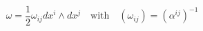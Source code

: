 \begin{equation}
    \label{eq:SymplecticForm}
    \omega = \frac{1}{2} \omega_{ij} dx^i \wedge dx^j 
    \quad
    \textrm{with}
    \quad
    (\omega_{ij}) = (\alpha^{ij})^{-1}
\end{equation}

